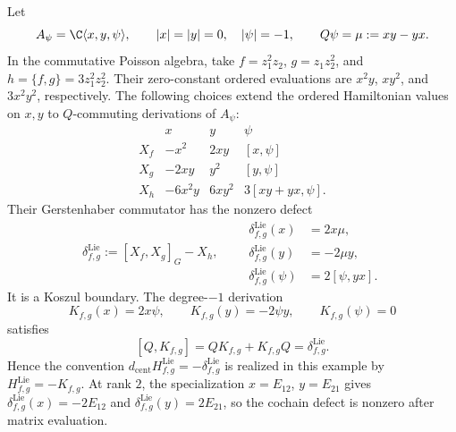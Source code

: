 \documentclass[11pt]{memoir}
\begin{document}
\begin{lem}
\label{lem:ordered-hamiltonian-lift-defect}
  Let
  \[
    A_\psi=\C\langle x,y,\psi\rangle,
    \qquad |x|=|y|=0,\quad |\psi|=-1,
    \qquad Q\psi=\mu:=xy-yx .
  \]
  In the commutative Poisson algebra, take
  \(f=z_1^2z_2\), \(g=z_1z_2^2\), and
  \(h=\{f,g\}=3z_1^2z_2^2\).  Their zero-constant ordered evaluations
  are \(x^2y\), \(xy^2\), and \(3x^2y^2\), respectively.  The following
  choices extend the ordered
  Hamiltonian values on \(x,y\) to \(Q\)-commuting derivations of
  \(A_\psi\):
  \[
    \begin{array}{c|ccc}
      &x&y&\psi\\ \hline
      X_f&-x^2&2xy&[x,\psi]\\
      X_g&-2xy&y^2&[y,\psi]\\
      X_h&-6x^2y&6xy^2&3[xy+yx,\psi].
    \end{array}
  \]
  Their Gerstenhaber commutator has the nonzero defect
  \[
    \delta^{\mathrm{Lie}}_{f,g}
      :=[X_f,X_g]_G-X_h,
    \qquad
    \begin{aligned}
      \delta^{\mathrm{Lie}}_{f,g}(x)&=2x\mu,\\
      \delta^{\mathrm{Lie}}_{f,g}(y)&=-2\mu y,\\
      \delta^{\mathrm{Lie}}_{f,g}(\psi)&=2[\psi,yx].
    \end{aligned}
  \]
  It is a Koszul boundary.  The degree-\(-1\) derivation
  \[
    K_{f,g}(x)=2x\psi,
    \qquad K_{f,g}(y)=-2\psi y,
    \qquad K_{f,g}(\psi)=0
  \]
  satisfies
  \[
    [Q,K_{f,g}]=QK_{f,g}+K_{f,g}Q
      =\delta^{\mathrm{Lie}}_{f,g}.
  \]
  Hence the convention
  \(d_{\mathrm{cent}}H^{\mathrm{Lie}}_{f,g}
    =-\delta^{\mathrm{Lie}}_{f,g}\)
  is realized in this example by \(H^{\mathrm{Lie}}_{f,g}=-K_{f,g}\).
  At rank \(2\), the specialization
  \(x=E_{12}\), \(y=E_{21}\) gives
  \(\delta^{\mathrm{Lie}}_{f,g}(x)=-2E_{12}\) and
  \(\delta^{\mathrm{Lie}}_{f,g}(y)=2E_{21}\), so the cochain defect is
  nonzero after matrix evaluation.
\end{lem}
\end{document}
